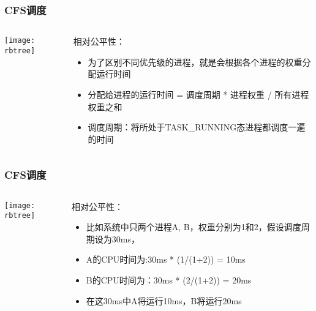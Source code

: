 \begin{frame}
	\frametitle{CFS调度}
	\begin{columns}
		\begin{column}{.4\textwidth}
			\Large \centering
			
			\texttt{[image: rbtree]}
			
		\end{column}
	
		
		\begin{column}{.6\textwidth}
			相对公平性：
			\begin{itemize}
				\item 为了区别不同优先级的进程，就是会根据各个进程的权重分配运行时间
				\item 分配给进程的运行时间 = 调度周期 * 进程权重 / 所有进程权重之和
				\item 调度周期：将所处于TASK\_RUNNING态进程都调度一遍的时间
				
			\end{itemize}
			
		\end{column}
	\end{columns}
\end{frame}


\begin{frame}
	\frametitle{CFS调度}
	\begin{columns}
		\begin{column}{.4\textwidth}
			\Large \centering
			
			\texttt{[image: rbtree]}
			
		\end{column}
		
		\begin{column}{.6\textwidth}
			相对公平性：
			\begin{itemize}
				\item 比如系统中只两个进程A, B，权重分别为1和2，假设调度周期设为30ms，
				\item A的CPU时间为:30ms * (1/(1+2)) = 10ms
				\item B的CPU时间为：30ms * (2/(1+2)) = 20ms
				\item 在这30ms中A将运行10ms，B将运行20ms
				
			\end{itemize}
			
		\end{column}
	\end{columns}
\end{frame}



